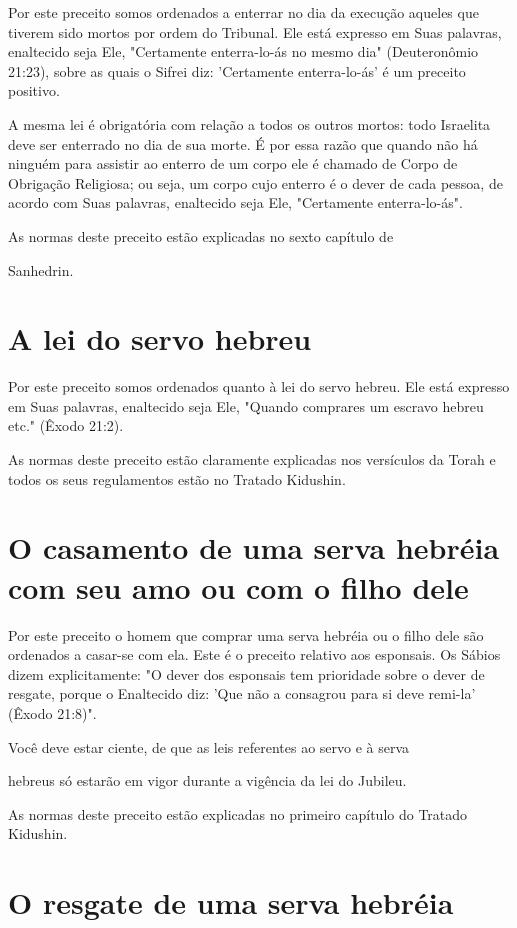 Por este preceito somos ordenados a enterrar no dia da execução aqueles
que tiverem sido mortos por ordem do Tribunal. Ele está expresso em Suas
palavras, enaltecido seja Ele, "Certamente enterra-lo-ás no mesmo dia"
(Deuteronômio 21:23), sobre as quais o Sifrei diz: 'Certamente
enterra-lo-ás' é um preceito positivo.

A mesma lei é obrigatória com relação a todos os outros mortos: to­do
Israelita deve ser enterrado no dia de sua morte. É por essa razão que
quan­do não há ninguém para assistir ao enterro de um corpo ele é
chamado de Corpo de Obrigação Religiosa; ou seja, um corpo cujo enterro
é o dever de cada pessoa, de acordo com Suas palavras, enaltecido seja
Ele, "Certamente enterra-lo-ás".


As normas deste preceito estão explicadas no sexto capítulo de


Sanhedrin.

\section{A lei do servo hebreu}

Por este preceito somos ordenados quanto à lei do servo hebreu. Ele está
expresso em Suas palavras, enaltecido seja Ele, "Quando comprares um
escravo hebreu etc." (Êxodo 21:2).

As normas deste preceito estão claramente explicadas nos versícu­los da
Torah e todos os seus regulamentos estão no Tratado Kidushin.

\section{O casamento de uma serva hebréia com seu amo ou com o filho dele}

Por este preceito o homem que comprar uma serva hebréia ou o fi­lho dele
são ordenados a casar-se com ela. Este é o preceito relativo aos
espon­sais. Os Sábios dizem explicitamente: "O dever dos esponsais tem
prioridade sobre o dever de resgate, porque o Enaltecido diz: 'Que não a
consagrou para si deve remi-la' (Êxodo 21:8)".


Você deve estar ciente, de que as leis referentes ao servo e à serva

hebreus só estarão em vigor durante a vigência da lei do Jubileu.

As normas deste preceito estão explicadas no primeiro capítulo do
Tratado Kidushin.

\section{O resgate de uma serva hebréia}

